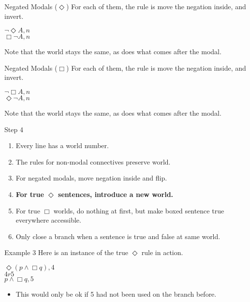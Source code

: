 \documentclass[
  14pt,
  letterpaper,
  ignorenonframetext,
  aspectratio=169,
  handout]{beamer}
\providecommand{\tightlist}{%
  \setlength{\itemsep}{0pt}\setlength{\parskip}{0pt}}\usepackage{longtable,booktabs,array}
\begin{document}
\begin{frame}{Negated Modals (\(\Diamond\))}
\protect\hypertarget{negated-modals-diamond}{}
For each of them, the rule is move the negation inside, and invert.

\begin{center}
$\neg \Diamond A, n$ \\
$\Box \neg A, n$
\end{center}

Note that the world stays the same, as does what comes after the modal.
\end{frame}

\begin{frame}{Negated Modals (\(\Box\))}
\protect\hypertarget{negated-modals-box}{}
For each of them, the rule is move the negation inside, and invert.

\begin{center}
$\neg \Box A, n$ \\
$\Diamond \neg A, n$
\end{center}

Note that the world stays the same, as does what comes after the modal.
\end{frame}

\begin{frame}{Step 4}
\protect\hypertarget{step-4}{}
\begin{enumerate}
\tightlist
\item
  Every line has a world number.
\item
  The rules for non-modal connectives preserve world.
\item
  For negated modals, move negation inside and flip.
\item
  \textbf{For true \(\Diamond\) sentences, introduce a new world.}
\item
  For true \(\Box\) worlds, do nothing at first, but make boxed sentence
  true everywhere accessible.
\item
  Only close a branch when a sentence is true and false at same world.
\end{enumerate}
\end{frame}

\begin{frame}{Example 3}
\protect\hypertarget{example-3}{}
Here is an instance of the true \(\Diamond\) rule in action.

\begin{center}
$\Diamond(p \wedge \Box q), 4$ \\
$4r5$ \\
$p \wedge \Box q, 5$
\end{center}

\begin{itemize}
\tightlist
\item
  This would only be ok if 5 had not been used on the branch before.
\end{itemize}
\end{frame}
\end{document}
